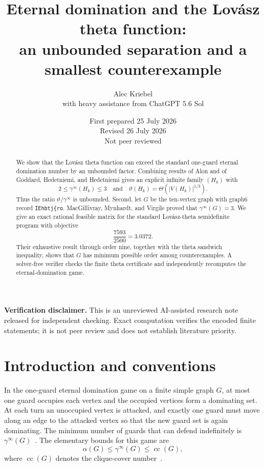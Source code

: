 \documentclass[11pt]{article}
\title{Eternal domination and the Lov\'asz theta function:\\
an unbounded separation and a smallest counterexample}
\author{Alec Kriebel\\[2pt]\large with heavy assistance from ChatGPT 5.6 Sol}
\date{First prepared 25 July 2026\\Revised 26 July 2026\\Not peer reviewed}
\newcommand{\cc}{\operatorname{cc}}
\begin{document}
\maketitle

\begin{abstract}
We show that the Lov\'asz theta function can exceed the standard one-guard
eternal domination number by an unbounded factor.  Combining results of Alon
and of Goddard, Hedetniemi, and Hedetniemi gives an explicit infinite family
\((H_k)\) with
\[
 2\leq\gamma^\infty(H_k)\leq3
 \quad\text{and}\quad
 \vartheta(H_k)=\Theta\!\left(|V(H_k)|^{1/3}\right).
\]
Thus the ratio \(\vartheta/\gamma^\infty\) is unbounded.  Second, let \(G\)
be the ten-vertex graph with graph6 record \texttt{IEhbtj\{ro}.
MacGillivray, Mynhardt, and Virgile proved that
\(\gamma^\infty(G)=3\).  We give an exact rational feasible matrix for the
standard Lov\'asz-theta semidefinite program with objective
\[
 \frac{7593}{2500}=3.0372.
\]
Their exhaustive result through order nine, together with the theta sandwich
inequality, shows that \(G\) has minimum possible order among counterexamples.
A solver-free verifier checks the finite theta certificate and independently
recomputes the eternal-domination game.
\end{abstract}

\noindent\textbf{Verification disclaimer.}
This is an unreviewed AI-assisted research note released for independent
checking.  Exact computation verifies the encoded finite statements; it is
not peer review and does not establish literature priority.

\section{Introduction and conventions}

In the one-guard eternal domination game on a finite simple graph \(G\), at
most one guard occupies each vertex and the occupied vertices form a
dominating set.  At each turn an unoccupied vertex is attacked, and exactly
one guard must move along an edge to the attacked vertex so that the new guard
set is again dominating.  The minimum number of guards that can defend
indefinitely is \(\gamma^\infty(G)\)~\cite{burger}.
The elementary bounds for this game are
\begin{equation}\label{eq:guard-bounds}
 \alpha(G)\leq\gamma^\infty(G)\leq\cc(G),
\end{equation}
where \(\cc(G)\) denotes the clique-cover number~\cite[Theorem~1]{ghh}.
\end{document}
